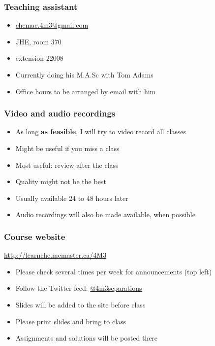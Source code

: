 \begin{frame}\frametitle{Teaching assistant}
	{\color{myGreen}{Dominik Seepersad}}
	\begin{itemize}
		\item	\url{chemac.4m3@gmail.com}
		\item	JHE, room 370
		\item	extension 22008
		\item	Currently doing his M.A.Sc with Tom Adams
		\item	Office hours to be arranged by email with him
	\end{itemize}
\end{frame}

\begin{frame}\frametitle{Video and audio recordings}
	\begin{itemize}
		\item	As long \textbf{as feasible}, I will try to video record all classes
		\item	Might be useful if you miss a class
		\item	Most useful: review after the class
		\item	Quality might not be the best
		\item	Usually available 24 to 48 hours later
		\item	Audio recordings will also be made available, when possible
	\end{itemize}
\end{frame}

\begin{frame}\frametitle{Course website}

	\begin{exampleblock}{}
		\centering
		\href{http://learnche.mcmaster.ca/4M3}{http://learnche.mcmaster.ca/4M3}
	\end{exampleblock}
	\begin{itemize}
		\item	Please check several times per week for announcements {\tiny (top left)}
		\item	Follow the Twitter feed: \href{https://twitter.com/4m3separations}{@4m3separations}
		\item	Slides will be added to the site before class
		\item	Please print slides and bring to class
		\item	Assignments and solutions will be posted there
	\end{itemize}
\end{frame}

